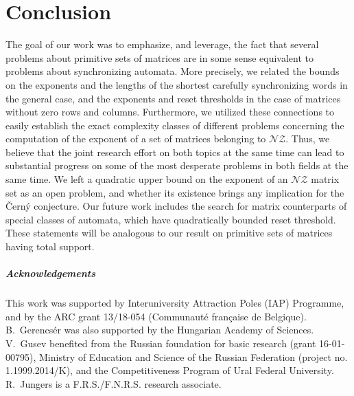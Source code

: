 \documentclass[a4paper,USenglish]{lipics}
\theoremstyle{definition}
\begin{document}
\section{Conclusion}
The goal of our work was to emphasize, and leverage, the fact that several problems about primitive sets of matrices are in some sense equivalent to problems about synchronizing automata. More precisely, we related the bounds on the exponents and the lengths of the shortest carefully synchronizing words in the general case, and the exponents and reset thresholds in the case of matrices without zero rows and columns. Furthermore, we utilized these connections to easily establish the exact complexity classes of different problems concerning the computation of the exponent of a set of matrices belonging to $\mathscr{NZ}$. Thus, we believe that the joint research effort on both topics at the same time can lead to substantial progress on some of the most desperate problems in both fields at the same time. We left a quadratic upper bound on the exponent of an $\mathscr{NZ}$ matrix set as an open problem, and whether its existence brings any implication for the \v{C}ern\'{y} conjecture. Our future work includes the search for matrix counterparts of special classes of automata, which have quadratically bounded reset threshold. These statements will be analogous to our result on primitive sets of matrices having total support.

\subparagraph*{Acknowledgements}
This work was supported by Interuniversity Attraction Poles (IAP) Programme, and by the ARC grant 13/18-054 (Communaut\'e fran\c{c}aise de Belgique). B.~Gerencs\'er was also supported by the Hungarian Academy of Sciences. V.~Gusev benefited from the Russian foundation for basic research (grant 16-01-00795), Ministry of Education and Science of the Russian Federation (project no. 1.1999.2014/K), and the Competitiveness Program of Ural Federal University. R.~Jungers is a F.R.S./F.N.R.S. research associate.


\end{document}
